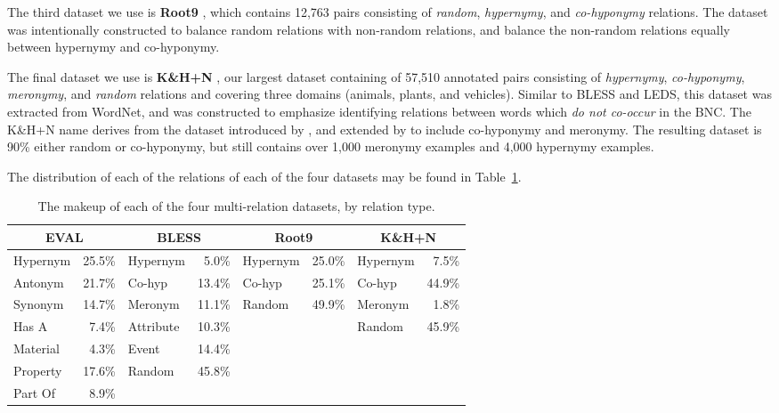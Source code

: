 The third dataset we use is {\bf Root9} \cite{santus:2016:lrec}, which contains
12,763 pairs consisting of {\em random}, {\em hypernymy}, and {\em co-hyponymy}
relations. The dataset was intentionally constructed to balance random
relations with non-random relations, and balance the non-random relations
equally between hypernymy and co-hyponymy.

The final dataset we use is {\bf K\&H+N} \cite{necsulescu:2015:starsem}, our
largest dataset containing of 57,510 annotated pairs consisting of {\em
hypernymy}, {\em co-hyponymy}, {\em meronymy}, and {\em random} relations and
covering three domains (animals, plants, and vehicles). Similar to BLESS and
LEDS, this dataset was extracted from WordNet, and was constructed to emphasize
identifying relations between words which {\em do not co-occur} in the BNC. The
K\&H+N name derives from the dataset introduced by ,
and extended by  to include co-hyponymy
and meronymy.  The resulting dataset is 90\% either random or co-hyponymy, but
still contains over 1,000 meronymy examples and 4,000 hypernymy examples.

The distribution of each of the relations of each of the four datasets may
be found in Table~\ref{tab:multimakeup}.

\begin{table}
\centering
\begin{small}
\begin{maybetiny}
\setlength\tabcolsep{1.15ex}
\begin{tabular}{|lr|lr|lr|lr|}
  \hline
  \multicolumn{2}{|c|}{{\bf EVAL}} & \multicolumn{2}{c|}{{\bf BLESS}} & \multicolumn{2}{c|}{{\bf Root9}} & \multicolumn{2}{c|}{{\bf K\&H+N}}\\
  \hline
  \hline
  Hypernym  & 25.5\% & Hypernym    &  5.0\% & Hypernym    & 25.0\% & Hypernym    &  7.5\% \\
  Antonym   & 21.7\% & Co-hyp      & 13.4\% & Co-hyp      & 25.1\% & Co-hyp      & 44.9\% \\
  Synonym   & 14.7\% & Meronym     & 11.1\% & Random      & 49.9\% & Meronym     &  1.8\% \\
  Has A     &  7.4\% & Attribute   & 10.3\% &             &        & Random      & 45.9\% \\
  Material  &  4.3\% & Event       & 14.4\% &             &        &             &        \\
  Property  & 17.6\% & Random      & 45.8\% &             &        &             &        \\
  Part Of   &  8.9\% &             &        &             &        &             &        \\
  \hline
\end{tabular}
\end{maybetiny}
\end{small}
\caption{The makeup of each of the four multi-relation datasets, by relation type.}
\label{tab:multimakeup}
\end{table}

